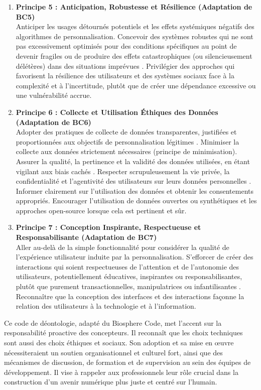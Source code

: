 \documentclass[10pt, twocolumn]{article}
\begin{document}
\begin{enumerate}
    \item \textbf{Principe 5 : Anticipation, Robustesse et Résilience (Adaptation de BC5)} \\
    Anticiper les usages détournés potentiels et les effets systémiques négatifs des algorithmes de personnalisation. Concevoir des systèmes robustes qui ne sont pas excessivement optimisés pour des conditions spécifiques au point de devenir fragiles ou de produire des effets catastrophiques (ou silencieusement délétères) dans des situations imprévues \citep{Biosphere2015}. Privilégier des approches qui favorisent la résilience des utilisateurs et des systèmes sociaux face à la complexité et à l'incertitude, plutôt que de créer une dépendance excessive ou une vulnérabilité accrue.

    \item \textbf{Principe 6 : Collecte et Utilisation Éthiques des Données (Adaptation de BC6)} \\
    Adopter des pratiques de collecte de données transparentes, justifiées et proportionnées aux objectifs de personnalisation légitimes \citep{Biosphere2015}. Minimiser la collecte aux données strictement nécessaires (principe de minimisation). Assurer la qualité, la pertinence et la validité des données utilisées, en étant vigilant aux biais cachés \citep{Biosphere2015}. Respecter scrupuleusement la vie privée, la confidentialité et l'agentivité des utilisateurs sur leurs données personnelles \citep{Montreal2018}. Informer clairement sur l'utilisation des données et obtenir les consentements appropriés. Encourager l'utilisation de données ouvertes ou synthétiques et les approches open-source lorsque cela est pertinent et sûr.

    \item \textbf{Principe 7 : Conception Inspirante, Respectueuse et Responsabilisante (Adaptation de BC7)} \\
    Aller au-delà de la simple fonctionnalité pour considérer la qualité de l'expérience utilisateur induite par la personnalisation. S'efforcer de créer des interactions qui soient respectueuses de l'attention et de l'autonomie des utilisateurs, potentiellement éducatives, inspirantes ou responsabilisantes, plutôt que purement transactionnelles, manipulatrices ou infantilisantes \citep{Biosphere2015}. Reconnaître que la conception des interfaces et des interactions façonne la relation des utilisateurs à la technologie et à l'information.
\end{enumerate}

Ce code de déontologie, adapté du Biosphere Code, met l'accent sur la responsabilité proactive des concepteurs. Il reconnaît que les choix techniques sont aussi des choix éthiques et sociaux. Son adoption et sa mise en œuvre nécessiteraient un soutien organisationnel et culturel fort, ainsi que des mécanismes de discussion, de formation et de supervision au sein des équipes de développement. Il vise à rappeler aux professionnels leur rôle crucial dans la construction d'un avenir numérique plus juste et centré sur l'humain.
\end{document}

